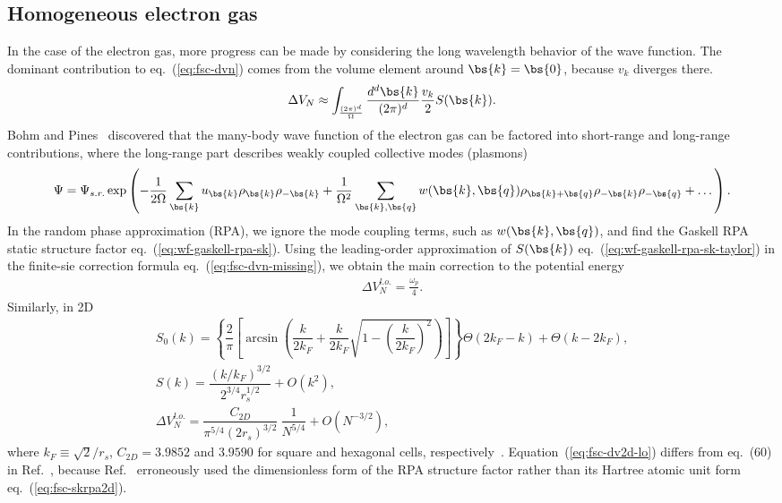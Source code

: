 \subsection{Homogeneous electron gas}
In the case of the electron gas, more progress can be made by considering the long wavelength behavior of the wave function. The dominant contribution to eq.~(\ref{eq:fsc-dvn}) comes from the volume element around $\bs{k}=\bs{0}$, because $v_k$ diverges there.
\begin{align} \label{eq:fsc-dvn-missing}
\Delta V_N \approx \int_{\frac{(2\pi)^d}{\Omega}} \dfrac{d^d\bs{k}}{(2\pi)^d} \frac{v_k}{2}S(\bs{k}).
\end{align}
Bohm and Pines~\cite{Bohm1953} discovered that the many-body wave function of the electron gas can be factored into short-range and long-range contributions, where the long-range part describes weakly coupled collective modes (plasmons)~\cite{Chiesa2007,Holzmann2016}
\begin{align} \label{eq:fsc-rpa-wf}
\Psi = \Psi_{s.r.} \exp\left(
-\frac{1}{2\Omega} \sum\limits_{\bs{k}} u_{\bs{k}} \rho_{\bs{k}} \rho_{-\bs{k}} + \frac{1}{\Omega^2}\sum\limits_{\bs{k},\bs{q}} w(\bs{k}, \bs{q}) \rho_{\bs{k}+\bs{q}}\rho_{-\bs{k}}\rho_{-\bs{q}}+\dots
\right).
\end{align}
In the random phase approximation (RPA), we ignore the mode coupling terms, such as $w(\bs{k},\bs{q})$, and find the Gaskell RPA static structure factor eq.~(\ref{eq:wf-gaskell-rpa-sk}).
Using the leading-order approximation of $S(\bs{k})$ eq.~(\ref{eq:wf-gaskell-rpa-sk-taylor}) in the finite-sie correction formula eq.~(\ref{eq:fsc-dvn-missing}), we obtain the main correction to the potential energy
\begin{align}
\Delta V_N^{l.o.} = \frac{\omega_p}{4}.
\end{align}
Similarly, in 2D~\cite{Gori-Giorgi2004}
\begin{align}
S_0(k) = \left\{
\dfrac{2}{\pi}\left[
\arcsin\left(\dfrac{k}{2k_F}+\dfrac{k}{2k_F}\sqrt{1-\left(\dfrac{k}{2k_F}\right)^2}\right)
\right]\right\} \Theta(2k_F-k) + \Theta(k-2k_F), \\
S(k) = \dfrac{(k/k_F)^{3/2}}{2^{3/4}r_s^{1/2}} + O(k^2), \label{eq:fsc-skrpa2d}\\
\Delta V_N^{l.o.} = \dfrac{C_{2D}}{\pi^{5/4} (2r_s)^{3/2}}~\dfrac{1}{N^{5/4}} + O(N^{-3/2}), \label{eq:fsc-dv2d-lo}
\end{align}
where $k_F\equiv\sqrt{2}/r_s$, $C_{2D}=3.9852$ and $3.9590$ for square and hexagonal cells, respectively~\cite{Drummond2008}. Equation~(\ref{eq:fsc-dv2d-lo}) differs from eq.~(60) in Ref.~\cite{Drummond2008}, because Ref.~\cite{Drummond2008} erroneously used the dimensionless form of the RPA structure factor rather than its Hartree atomic unit form eq.~(\ref{eq:fsc-skrpa2d}).

